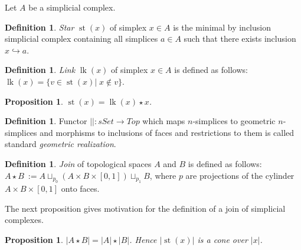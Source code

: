 \documentclass[a4paper, 12pt]{article}
\newcounter{stmcounter}[section]
\numberwithin{equation}{section}
\newtheorem{proposition}[stmcounter]{Proposition}
\theoremstyle{definition}
\newtheorem{definition}[stmcounter]{Definition}
\theoremstyle{remark}
\newcommand{\define}[1]{{\textit{#1}}}
\begin{document}
Let $A$ be a simplicial complex.

\begin{definition}
  \define{Star} $\operatorname{st}(x)$ of simplex $x \in A$ is the minimal by inclusion simplicial complex containing all simplices $a \in A$ such that there exists inclusion $x \hookrightarrow a$.
\end{definition}

\begin{definition}
  \define{Link} $\operatorname{lk}(x)$ of simplex $x \in A$ is defined as follows: $\operatorname{lk}(x) = \{v \in \operatorname{st}(x)|\; x \not\in v\}$.
\end{definition}

\begin{proposition}
  $\operatorname{st}(x) = \operatorname{lk}(x) \star x$.
\end{proposition}

\begin{definition}
  Functor $\left|\right| : sSet \to Top$ which maps $n$-simplices to geometric $n$-simplices and morphisms to inclusions of faces and restrictions to them is called standard \define{geometric realization}.
\end{definition}

\begin{definition}
  \define{Join} of topological spaces $A$ and $B$ is defined as follows: $A \star B\ := A \sqcup_{p_0} (A \times B \times [0,1]) \sqcup_{p_1} B$, where $p$ are projections of the cylinder $A \times B \times [0,1]$ onto faces.
\end{definition}

The next proposition gives motivation for the definition of a join of simplicial complexes.

\begin{proposition}
  $\left|A \star B\right| = \left|A\right| \star \left|B\right|$. Hence $\left|\operatorname{st}(x)\right|$ is a cone over $\left|x\right|$.
\end{proposition}
\end{document}
